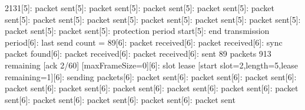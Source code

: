 \documentclass[parskip]{cs4rep}
\begin{document}
2131[5]: packet sent[5]: packet sent[5]: packet sent[5]: packet sent[5]: packet sent[5]: packet sent[5]: packet sent[5]: packet sent[5]: packet sent[5]: packet sent[5]: packet sent[5]: packet sent[5]: protection period start[5]: end transmission period[6]: last send count = 89[6]: packet received[6]: packet received[6]: sync packet found[6]: packet received[6]: packet received[6]: sent 89 packets 913 remaining [ack 2/60] [maxFrameSize=0][6]: slot lease [start slot=2,length=5,lease remaining=1][6]: sending packets[6]: packet sent[6]: packet sent[6]: packet sent[6]: packet sent[6]: packet sent[6]: packet sent[6]: packet sent[6]: packet sent[6]: packet sent[6]: packet sent[6]: packet sent[6]: packet sent[6]: packet sent\newline
\end{document}
